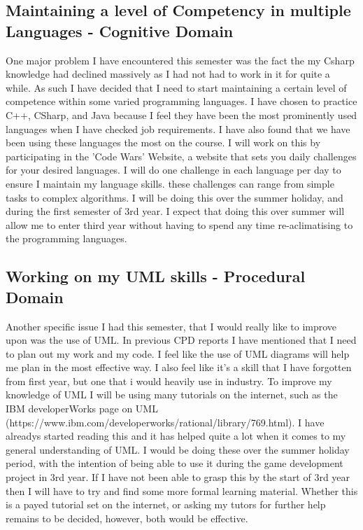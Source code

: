 \documentclass{scrartcl}
\begin{document}
\subsection{Maintaining a level of Competency in multiple Languages - Cognitive Domain}
One major problem I have encountered this semester was the fact the my Csharp  knowledge had declined massively as I had not had to work in it for quite a while. As such I have decided that I need to start maintaining a certain level of competence within some varied programming languages. I have chosen to practice C++, CSharp, and Java because I feel they have been the most prominently used languages when I have checked job requirements. I have also found that we have been using these languages the most on the course. I will work on this by participating in the 'Code Wars' Website, a website that sets you daily challenges for your desired languages. I will do one challenge in each language per day to ensure I maintain my language skills. these challenges can range from simple tasks to complex algorithms. I will be doing this over the summer holiday, and during the first semester of 3rd year. I expect that doing this over summer will allow me to enter third year without having to spend any time re-aclimatising to the programming languages.
 
\subsection{Working on my UML skills - Procedural Domain}
Another specific issue I had this semester, that I would really like to improve upon was the use of UML. In previous CPD reports I have mentioned that I need to plan out my work and my code. I feel like the use of UML diagrams will help me plan in the most effective way. I also feel like it's a skill that I have forgotten from first year, but one that i would heavily use in industry. To improve my knowledge of UML I will be using many tutorials on the internet, such as the IBM developerWorks page on UML (https://www.ibm.com/developerworks/rational/library/769.html). I have alreadys started reading this and it has helped quite a lot when it comes to my general understanding of UML. I would be doing these over the summer holiday period, with the intention of  being able to use it during the game development project in 3rd year. If I have not been able to grasp this by the start of 3rd year then I will have to try and find some more formal learning material. Whether this is a payed tutorial set on the internet, or asking my tutors for further help remains to be decided, however, both would be effective.
\end{document}
